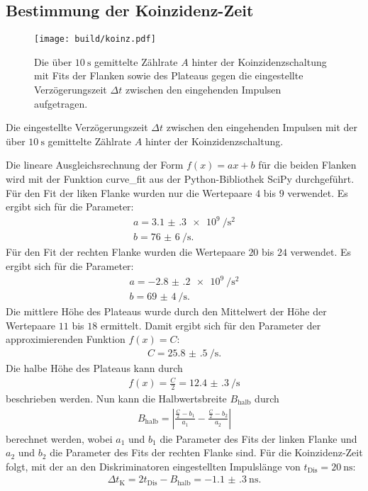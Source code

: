 \subsection{Bestimmung der Koinzidenz-Zeit}
\label{subsec:Koinzidenz}
\begin{figure}
	\centering
	\texttt{[image: build/koinz.pdf]}
	\caption{Die über $\SI{10}{\second}$ gemittelte Zählrate $A$ hinter der Koinzidenzschaltung mit Fits der Flanken sowie des Plateaus gegen die eingestellte Verzögerungszeit $\varDelta t$ zwischen den eingehenden Impulsen aufgetragen.}
	\label{fig:zweite}
\end{figure}
\begin{table}
	\centering
	\caption{Die eingestellte Verzögerungszeit $\varDelta t$ zwischen den eingehenden Impulsen mit der über $\SI{10}{\second}$ gemittelte Zählrate $A$ hinter der Koinzidenzschaltung.}
	
\end{table}
Die lineare Ausgleichsrechnung der Form $f(x)=ax +b$ für die beiden Flanken wird mit der Funktion curve\_fit aus der Python-Bibliothek SciPy \cite{scipy} durchgeführt. Für den Fit der liken Flanke wurden nur die Wertepaare $4$ bis $9$ verwendet. Es ergibt sich für die Parameter:
\begin{gather*}
	a=\SI{3.1(3)e9}{\per\second\tothe{2}}\\
	b=\SI{76(6)}{\per\second}.
\end{gather*}
Für den Fit der rechten Flanke wurden die Wertepaare $20$ bis $24$ verwendet. Es ergibt sich für die Parameter:
\begin{gather*}
	a=\SI{-2.8(2)e9}{\per\second\tothe{2}}\\
	b=\SI{69(4)}{\per\second}.
\end{gather*}
Die mittlere Höhe des Plateaus wurde durch den Mittelwert der Höhe der Wertepaare $11$ bis $18$ ermittelt. Damit ergibt sich für den Parameter der approximierenden Funktion $f(x)=C$:
\begin{gather*}
	C=\SI{25.8(5)}{\per\second}.
\end{gather*}
Die halbe Höhe des Plateaus kann durch 
\begin{gather*}
	f(x)=\frac{C}{2}=\SI{12.4(3)}{\per\second}
\end{gather*}
beschrieben werden.
Nun kann die Halbwertsbreite $B_\text{halb}$ durch
\begin{gather*}
	B_\text{halb}=\left|\frac{\frac{C}{2}-b_1}{a_1}-\frac{\frac{C}{2}-b_2}{a_2}\right|
\end{gather*}
berechnet werden, wobei $a_1$ und $b_1$ die Parameter des Fits der linken Flanke und $a_2$ und $b_2$ die Parameter des Fits der rechten Flanke sind.
Für die Koinzidenz-Zeit folgt, mit der an den Diskriminatoren eingestellten Impulslänge von $t_\text{Dis}=\SI{20}{\nano\second}$:
\begin{gather*}
	\Delta t_\text{K}=2 t_\text{Dis}-B_\text{halb}=\SI{-1.1(3)}{\nano\second}.
\end{gather*}

